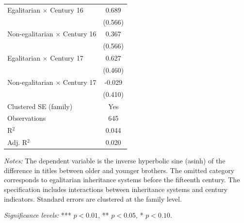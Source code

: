 \begin{table}[H]
\begin{tablebody}
\begin{tabular}{p{6.8cm} c}
Egalitarian $\times$ Century 16
& 0.689 \\
& (0.566) \\

Non-egalitarian $\times$ Century 16
& 0.367 \\
& (0.566) \\

Egalitarian $\times$ Century 17
& 0.627 \\
& (0.460) \\

Non-egalitarian $\times$ Century 17
& -0.029 \\
& (0.410) \\

\midrule
Clustered SE (family) & Yes \\
Observations & 645 \\
R$^{2}$ & 0.044 \\
Adj. R$^{2}$ & 0.020 \\
\bottomrule
\end{tabular}
\end{tablebody}

\vspace{4pt}
\begin{minipage}{\textwidth}
\footnotesize
\textit{Notes:} The dependent variable is the inverse hyperbolic sine (asinh) of the difference in titles between older and younger brothers. The omitted category corresponds to egalitarian inheritance systems before the fifteenth century. The specification includes interactions between inheritance systems and century indicators. Standard errors are clustered at the family level. 

\textit{Significance levels:} *** $p<0.01$, ** $p<0.05$, * $p<0.10$.
\end{minipage}

\end{table}